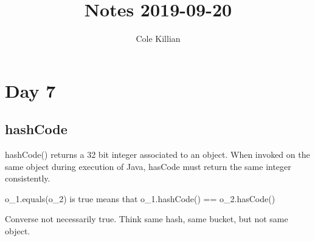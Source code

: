 \documentclass{article}
\begin{document}
\title{Notes 2019-09-20}
\author{Cole Killian}

\maketitle

\section{Day 7}

\subsection{hashCode}

hashCode() returns a 32 bit integer associated to an object. When invoked on the same object during execution of Java, hasCode must return the same integer consistently.

o_1.equals(o_2) is true means that o_1.hashCode() == o_2.hasCode()

Converse not necessarily true. Think same hash, same bucket, but not same object.
\end{document}
